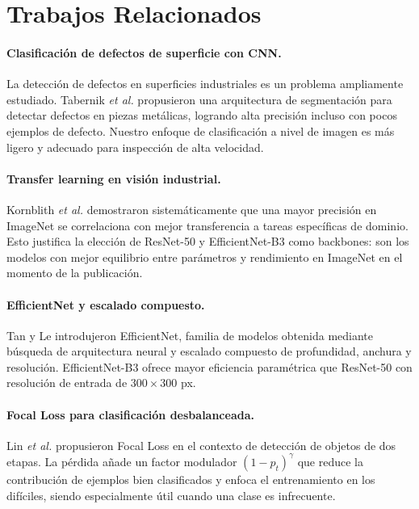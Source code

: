 \documentclass{article}
\begin{document}
\section{Trabajos Relacionados}
\label{sec:related}

\paragraph{Clasificación de defectos de superficie con CNN.}
La detección de defectos en superficies industriales es un problema ampliamente 
estudiado. Tabernik \emph{et al.} \cite{tabernik2020segmentation} propusieron una 
arquitectura de segmentación para detectar defectos en piezas metálicas, logrando 
alta precisión incluso con pocos ejemplos de defecto. Nuestro enfoque de clasificación 
a nivel de imagen es más ligero y adecuado para inspección de alta velocidad.

\paragraph{Transfer learning en visión industrial.}
Kornblith \emph{et al.} \cite{kornblith2019better} demostraron sistemáticamente que 
una mayor precisión en ImageNet se correlaciona con mejor transferencia a tareas 
específicas de dominio. Esto justifica la elección de ResNet-50 y EfficientNet-B3 como 
backbones: son los modelos con mejor equilibrio entre parámetros y rendimiento en 
ImageNet en el momento de la publicación.

\paragraph{EfficientNet y escalado compuesto.}
Tan y Le \cite{tan2019efficientnet} introdujeron EfficientNet, familia de modelos 
obtenida mediante búsqueda de arquitectura neural y escalado compuesto de profundidad, 
anchura y resolución. EfficientNet-B3 ofrece mayor eficiencia paramétrica que ResNet-50 
con resolución de entrada de $300 \times 300$ px.

\paragraph{Focal Loss para clasificación desbalanceada.}
Lin \emph{et al.} \cite{lin2017focal} propusieron Focal Loss en el contexto de 
detección de objetos de dos etapas. La pérdida añade un factor modulador 
$(1 - p_t)^\gamma$ que reduce la contribución de ejemplos bien clasificados y 
enfoca el entrenamiento en los difíciles, siendo especialmente útil cuando una clase 
es infrecuente.
\end{document}
